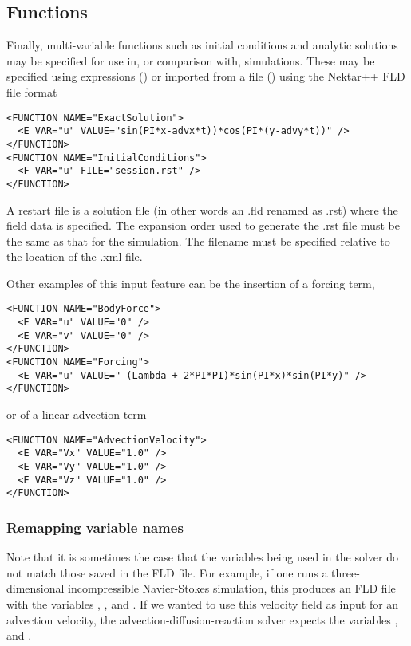 \subsection{Functions}

Finally, multi-variable functions such as initial conditions and analytic
solutions may be specified for use in, or comparison with, simulations. These
may be specified using expressions () or imported from a file
() using the Nektar++ FLD file format

\begin{lstlisting}[style=XMLStyle]
<FUNCTION NAME="ExactSolution">
  <E VAR="u" VALUE="sin(PI*x-advx*t))*cos(PI*(y-advy*t))" />
</FUNCTION>
<FUNCTION NAME="InitialConditions">
  <F VAR="u" FILE="session.rst" />
</FUNCTION>
\end{lstlisting}

A restart file is a solution file (in other words an .fld renamed as .rst) where
the field data is specified. The expansion order used to generate the .rst file
must be the same as that for the simulation. The filename must be specified
relative to the location of the .xml file.

Other examples of this input feature can be the insertion of a forcing term,

\begin{lstlisting}[style=XMLStyle]
<FUNCTION NAME="BodyForce">
  <E VAR="u" VALUE="0" />
  <E VAR="v" VALUE="0" />
</FUNCTION>
<FUNCTION NAME="Forcing">
  <E VAR="u" VALUE="-(Lambda + 2*PI*PI)*sin(PI*x)*sin(PI*y)" />
</FUNCTION>
\end{lstlisting}

or of a linear advection term

\begin{lstlisting}[style=XMLStyle]
<FUNCTION NAME="AdvectionVelocity">
  <E VAR="Vx" VALUE="1.0" />
  <E VAR="Vy" VALUE="1.0" />
  <E VAR="Vz" VALUE="1.0" />
</FUNCTION>
\end{lstlisting}

\subsubsection{Remapping variable names}

Note that it is sometimes the case that the variables being used in the solver
do not match those saved in the FLD file. For example, if one runs a
three-dimensional incompressible Navier-Stokes simulation, this produces an FLD
file with the variables , ,  and . If we
wanted to use this velocity field as input for an advection velocity, the
advection-diffusion-reaction solver expects the variables , 
and .

